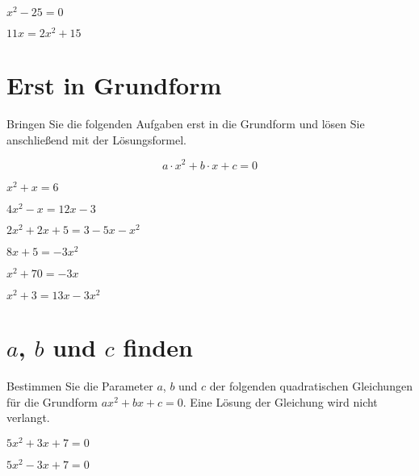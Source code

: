 {\begin{bbwAufgabenBlock}
\item $ x^2-25 =0 $

\item $11x=2x^2+15 $


\end{bbwAufgabenBlock}
\newpage
\section{Erst in Grundform}
Bringen Sie die folgenden Aufgaben erst in die Grundform und lösen Sie anschließend mit der Lösungsformel.

$$a\cdot{}x^2 + b\cdot{}x + c = 0$$

\begin{bbwAufgabenBlock}
\item $ x^2+x= 6$

\item $4x^2-x =12x-3 $

\item $ 2x^2+2x+5 = 3-5x-x^2 $

\item $ 8x + 5 = -3x^2 $

\item $x^2 + 70 = -3x$
\LoesungsBlock{$\lx=\left\{    \right\}$}

\item $ x^2+3= 13x-3x^2$

\end{bbwAufgabenBlock}
\newpage
\section{$a$, $b$ und $c$ finden}
Bestimmen Sie die Parameter $a$, $b$ und $c$ der folgenden quadratischen Gleichungen für die Grundform $ax^2 +bx +c = 0$. Eine Lösung der Gleichung wird nicht verlangt.
\begin{bbwAufgabenBlock}
\item $5x^2+3x+7 = 0$

\item $5x^2-3x+7 = 0$


\end{bbwAufgabenBlock}}
